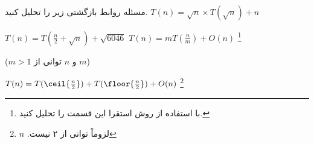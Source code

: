 ‌مسئله
روابط بازگشتی زیر را تحلیل کنید.
$T(n) = \sqrt n \times T(\sqrt n) + n$


$T(n) = T(\frac{n}{2} + \sqrt n) + \sqrt {6046}$
$T(n) = mT(\frac{n}{m})+ O(n)$ \footnote{با استفاده از روش استقرا این قسمت را تحلیل کنید.}

($m > 1$ و $n$ توانی از $m$)

$T(n) = T( \ceil{ \frac{n}{2}}) + T( \floor{ \frac{n}{2}}) + O(n)$ \footnote{$n$ .لزوماً توانی از ۲ نیست}


